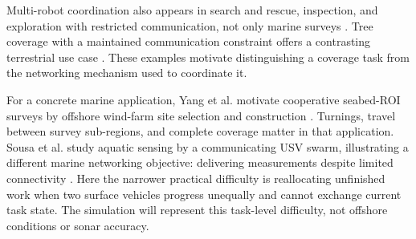 Multi-robot coordination also appears in search and rescue, inspection, and exploration with restricted communication, not only marine surveys \cite{bramblett2023epistemic}. Tree coverage with a maintained communication constraint offers a contrasting terrestrial use case \cite{sinay2017tree}. These examples motivate distinguishing a coverage task from the networking mechanism used to coordinate it.

For a concrete marine application, Yang et al. motivate cooperative seabed-ROI surveys by offshore wind-farm site selection and construction \cite{yang2023cooperative}. Turnings, travel between survey sub-regions, and complete coverage matter in that application. Sousa et al. study aquatic sensing by a communicating USV swarm, illustrating a different marine networking objective: delivering measurements despite limited connectivity \cite{sousa2018aquatic}. Here the narrower practical difficulty is reallocating unfinished work when two surface vehicles progress unequally and cannot exchange current task state. The simulation will represent this task-level difficulty, not offshore conditions or sonar accuracy.
